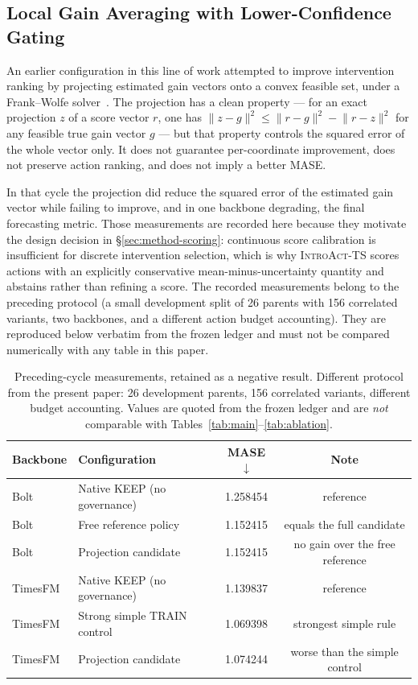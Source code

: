 \documentclass{article}
\newcommand{\introact}{\textsc{IntroAct-TS}}
\begin{document}
\subsection{Local Gain Averaging with Lower-Confidence Gating}
\label{app:r5}
An earlier configuration in this line of work attempted to improve intervention ranking by
projecting estimated gain vectors onto a convex feasible set, under a Frank--Wolfe
solver~\citep{boyd2004convex,jaggi2013revisiting}. The projection has a clean property ---
for an exact projection $z$ of a score vector $r$, one has
$\lVert z - g \rVert^2 \le \lVert r - g \rVert^2 - \lVert r - z \rVert^2$ for any feasible
true gain vector $g$ --- but that property controls the squared error of the whole vector
only. It does not guarantee per-coordinate improvement, does not preserve action ranking,
and does not imply a better MASE.

In that cycle the projection did reduce the squared error of the estimated gain vector
while failing to improve, and in one backbone degrading, the final forecasting metric.
Those measurements are recorded here because they motivate the design decision in
\S\ref{sec:method-scoring}: continuous score calibration is insufficient for discrete
intervention selection, which is why \introact{} scores actions with an explicitly
conservative mean-minus-uncertainty quantity and abstains rather than refining a score.
The recorded measurements belong to the preceding protocol (a small development split of
26 parents with 156 correlated variants, two backbones, and a different action budget
accounting). They are reproduced below verbatim from the frozen ledger and must not be
compared numerically with any table in this paper.

\begin{table}[h]
  \caption{Preceding-cycle measurements, retained as a negative result. Different protocol
  from the present paper: 26 development parents, 156 correlated variants, different
  budget accounting. Values are quoted from the frozen ledger and are \emph{not}
  comparable with Tables~\ref{tab:main}--\ref{tab:ablation}.}
  \label{tab:r5negative}
  \centering
  \small
  \begin{tabular}{llcc}
    \toprule
    Backbone & Configuration & MASE $\downarrow$ & Note \\
    \midrule
    Bolt     & Native KEEP (no governance)   & 1.258454 & reference \\
    Bolt     & Free reference policy         & 1.152415 & equals the full candidate \\
    Bolt     & Projection candidate          & 1.152415 & no gain over the free reference \\
    TimesFM  & Native KEEP (no governance)   & 1.139837 & reference \\
    TimesFM  & Strong simple TRAIN control   & 1.069398 & strongest simple rule \\
    TimesFM  & Projection candidate          & 1.074244 & worse than the simple control \\
    \bottomrule
  \end{tabular}
\end{table}
\end{document}
